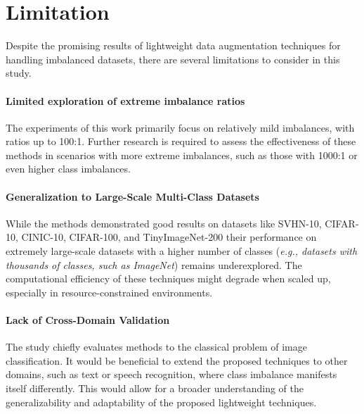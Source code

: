 \section{Limitation}

Despite the promising results of lightweight data augmentation techniques for handling imbalanced datasets, there are several limitations to consider in this study.

\paragraph{Limited exploration of extreme imbalance ratios} The experiments of this work primarily focus on relatively mild imbalances, with ratios up to 100:1. Further research is required to assess the effectiveness of these methods in scenarios with more extreme imbalances, such as those with 1000:1 or even higher class imbalances. 

\paragraph{Generalization to Large-Scale Multi-Class Datasets} While the methods demonstrated good results on datasets like SVHN-10, CIFAR-10, CINIC-10, CIFAR-100, and TinyImageNet-200 their performance on extremely large-scale datasets with a higher number of classes (\textit{e.g., datasets with thousands of classes, such as ImageNet}) remains underexplored. The computational efficiency of these techniques might degrade when scaled up, especially in resource-constrained environments.

\paragraph{Lack of Cross-Domain Validation}The study chiefly evaluates methods to the classical problem of image classification. It would be beneficial to extend the proposed techniques to other domains, such as text or speech recognition, where class imbalance manifests itself differently. This would allow for a broader understanding of the generalizability and adaptability of the proposed lightweight techniques.


